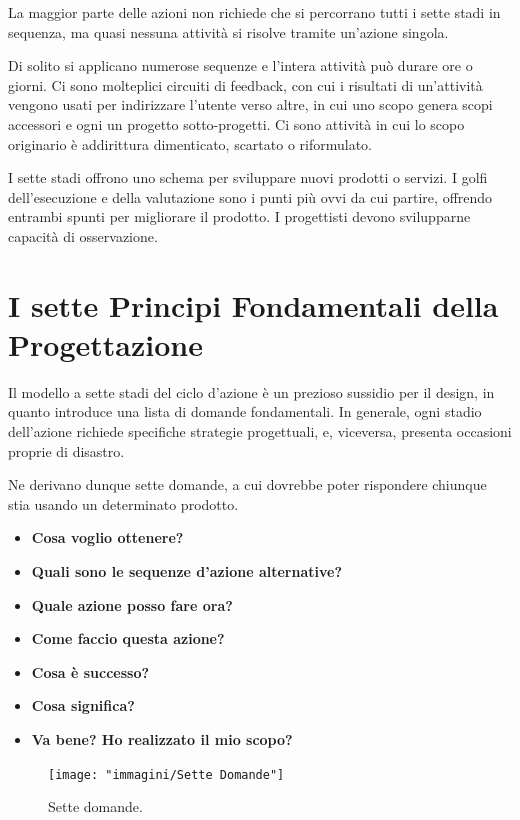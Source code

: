 La maggior parte delle azioni non richiede che si percorrano tutti i sette stadi in sequenza, ma quasi nessuna attività si risolve tramite
un'azione singola.

Di solito si applicano numerose sequenze e l'intera attività può durare ore o giorni. Ci sono molteplici circuiti di feedback, con cui i risultati
di un'attività vengono usati per indirizzare l'utente verso altre, in cui uno scopo genera scopi accessori e ogni un progetto sotto-progetti. Ci sono
attività in cui lo scopo originario è addirittura dimenticato, scartato o riformulato.

I sette stadi offrono uno schema per sviluppare nuovi prodotti o servizi. I golfi dell'esecuzione e della valutazione sono i punti più ovvi da cui
partire, offrendo entrambi spunti per migliorare il prodotto. I progettisti devono svilupparne capacità di osservazione.

\section{I sette Principi Fondamentali della Progettazione}
Il modello a sette stadi del ciclo d'azione è un prezioso sussidio per il design, in quanto introduce una lista di domande fondamentali. In generale,
ogni stadio dell'azione richiede specifiche strategie progettuali, e, viceversa, presenta occasioni proprie di disastro.

Ne derivano dunque sette domande, a cui dovrebbe poter rispondere chiunque stia usando un determinato prodotto.

\begin{itemize}
	\itemsep-0.3em
	\item \textbf{Cosa voglio ottenere?}
	\item \textbf{Quali sono le sequenze d'azione alternative?}
	\item \textbf{Quale azione posso fare ora?}
	\item \textbf{Come faccio questa azione?}
	\item \textbf{Cosa è successo?}
	\item \textbf{Cosa significa?}
	\item \textbf{Va bene? Ho realizzato il mio scopo?}
\end{itemize}

\begin{figure}[!h]
	\centering
	\texttt{[image: "immagini/Sette Domande"]}
	\caption{Sette domande.}
\end{figure}


